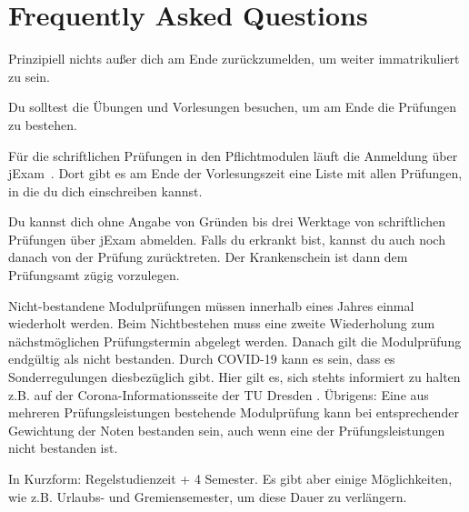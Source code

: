\newcommand{\fancypageref}[1] {%
    \changemenucolor{gray}{br}{named}{ese_bg_color}%
    \changemenucolor{gray}{txt}{named}{ese_bg_color}%
    \keys{Seite \pageref{#1}}%
    \changemenucolor{gray}{br}{named}{ese_bg_color}%
    \changemenucolor{gray}{txt}{named}{ese_bg_color}%
}

\chapter*{Frequently Asked Questions}
\label{sec:faq}
Prinzipiell nichts außer dich am Ende zurückzumelden, um weiter immatrikuliert zu sein.

Du solltest die Übungen und Vorlesungen besuchen, um am Ende die Prüfungen zu bestehen.

Für die schriftlichen Prüfungen in den Pflichtmodulen läuft die Anmeldung über jExam~.
Dort gibt es am Ende der Vorlesungszeit eine Liste mit allen Prüfungen, in die du dich einschreiben kannst.

Du kannst dich ohne Angabe von Gründen bis drei Werktage von schriftlichen Prüfungen über jExam abmelden. Falls du erkrankt bist, kannst du auch noch danach von der Prüfung zurücktreten. Der Krankenschein ist dann dem Prüfungsamt zügig vorzulegen.

Nicht-bestandene Modulprüfungen müssen innerhalb eines Jahres einmal wiederholt werden. Beim Nichtbestehen muss eine zweite Wiederholung zum nächstmöglichen Prüfungstermin abgelegt werden. Danach gilt die Modulprüfung endgültig als nicht bestanden. 
Durch COVID-19 kann es sein, dass es Sonderregulungen diesbezüglich gibt. Hier gilt es, sich stehts informiert zu halten z.B. auf der Corona-Informationsseite der TU Dresden . 
Übrigens: Eine aus mehreren Prüfungsleistungen bestehende Modulprüfung kann bei entsprechender Gewichtung der Noten bestanden sein, auch wenn eine der Prüfungsleistungen nicht bestanden ist.

In Kurzform: Regelstudienzeit + 4 Semester. Es gibt aber einige Möglichkeiten, wie z.B. Urlaubs- und Gremiensemester, um diese Dauer zu verlängern.

